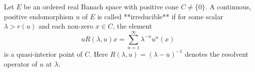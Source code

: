 Let $E$ be an ordered real Banach space with positive cone $C \neq \{0\}$. A continuous, positive endomorphism $u$ of $E$ is called **irreducible** if for some scalar $\lambda > r(u)$ and each non-zero $x \in C$, the element
$$u R(\lambda, u) x = \sum_{n=1}^{\infty} \lambda^{-n} u^n(x)$$
is a quasi-interior point of $C$. Here $R(\lambda, u) = (\lambda - u)^{-1}$ denotes the resolvent operator of $u$ at $\lambda$.

